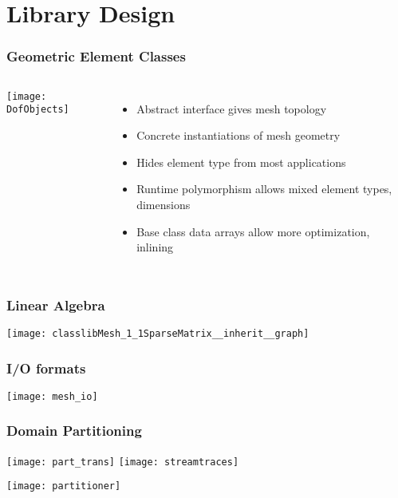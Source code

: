 \section{Library Design}


\begin{frame}
\frametitle{Geometric Element Classes}

\begin{columns}
\begin{center}
\vspace{-5mm}
\texttt{[image: DofObjects]}
\end{center}
\begin{itemize}
\item Abstract interface gives mesh topology
\item Concrete instantiations of mesh geometry
\item Hides element type from most applications
\item Runtime polymorphism allows mixed element types, dimensions
\item Base class data arrays allow more optimization, inlining
\end{itemize}

\end{columns}

\end{frame}


\frame
{
  \frametitle{Linear Algebra}
  \begin{center}
    \texttt{[image: classlibMesh\_1\_1SparseMatrix\_\_inherit\_\_graph]}
  \end{center}
}



\frame
{
  \frametitle{I/O formats}
  \begin{center}
    \texttt{[image: mesh\_io]}
  \end{center}
}


\frame
{
  \frametitle{Domain Partitioning}
  \begin{center}
    \texttt{[image: part\_trans]}
    \texttt{[image: streamtraces]}
  \end{center}  

  \texttt{[image: partitioner]}
}


